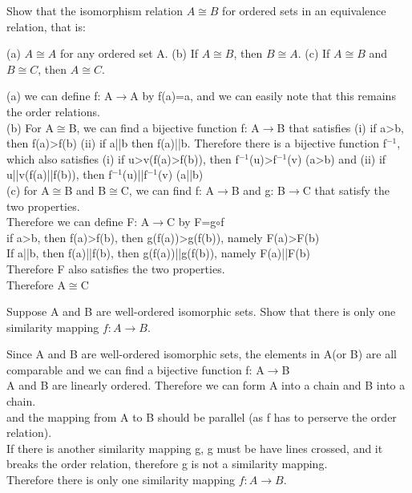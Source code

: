 \documentclass[11pt, a4paper, UTF8]{ctexart}
\begin{document}
\begin{problem}[SM: 14.58]
Show that the isomorphism relation \(A \cong B\) for ordered sets in an equivalence relation, that is:

(a) \(A \cong A\) for any ordered set A. (b) If \(A \cong B\), then \(B \cong A\). (c) If \(A \cong B\) and \(B \cong C\), then \(A \cong C\).
\end{problem}
\begin{solution}
(a) we can define f: A$\rightarrow$A by f(a)=a, and we can easily note that this remains the order relations.\\
(b) For A$\cong$B, we can find a bijective function f: A$\rightarrow$B that satisfies (i) if a>b, then f(a)>f(b) (ii) if a||b then f(a)||b. Therefore there is a bijective function f$^{-1}$, which also satisfies (i) if u>v(f(a)>f(b)), then f$^{-1}$(u)>f$^{-1}$(v) (a>b) and (ii) if u||v(f(a)||f(b)), then f$^{-1}$(u)||f$^{-1}$(v) (a||b)\\
(c) for A$\cong$B and B$\cong$C, we can find f: A$\rightarrow$B and g: B$\rightarrow$C that satisfy the two properties.\\
Therefore we can define F: A$\rightarrow$C by F=g$\circ$f\\
if a>b, then f(a)>f(b), then g(f(a))>g(f(b)), namely F(a)>F(b)\\
If a||b, then f(a)||f(b), then g(f(a))||g(f(b)), namely F(a)||F(b)\\
Therefore F also satisfies the two properties.\\
Therefore A$\cong$C
\end{solution}



\begin{problem}[SM: 14.62]
Suppose A and B are well-ordered isomorphic sets. Show that there is only one similarity mapping \(f: A → B\).
\end{problem}
\begin{solution}
Since A and B are well-ordered isomorphic sets, the elements in A(or B) are all comparable and we can find a bijective function f: A$\rightarrow$B\\
A and B are linearly ordered. Therefore we can form A into a chain and B into a chain.\\
and the mapping from A to B should be parallel (as f has to perserve the order relation).\\
If there is another similarity mapping g, g must be have lines crossed, and it breaks the order relation, therefore g is not a similarity mapping.\\
Therefore there is only one similarity mapping \(f: A → B\).\\
\end{solution}
\end{document}
